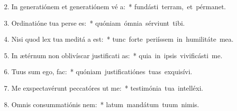 \begin{flushleft}
\begin{enumerate}[leftmargin=*]
\setcounter{enumi}{1}

\item In generatiónem et generatiónem vé a:~* \mbox{fundásti terram, et pérmanet.}
\item Ordinatióne tua perse es:~* \mbox{quóniam ómnia sérviunt tibi.}
\item Nisi quod lex tua meditá a est:~* \mbox{tunc forte periíssem in humilitáte mea.}
\item In ætérnum non oblivíscar justificati as:~* \mbox{quia in ipsis vivificásti me.}
\item Tuus sum ego,   fac:~* \mbox{quóniam justificatiónes tuas exquisívi.}
\item Me exspectavérunt peccatóres ut  me:~* \mbox{testimónia tua intelléxi.}
\item Omnis consummatiónis  nem:~* \mbox{latum mandátum tuum nimis.}


\end{enumerate}
\end{flushleft}

